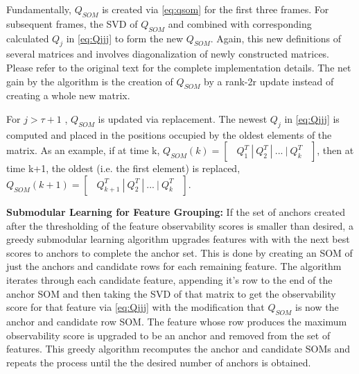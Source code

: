 \documentclass[10pt,twocolumn,letterpaper]{article}
\begin{document}
Fundamentally, $Q_{SOM}$ is created via \eqref{eq:qsom} 
for the first three frames. For subsequent frames, the SVD of $Q_{SOM}$ and combined with corresponding calculated ${Q}_{j}$ in \eqref{eq:Qjjj} to form the new $Q_{SOM}$. Again, this new definitions of several matrices and involves diagonalization of newly constructed matrices. Please refer to the original text for the complete implementation details. The net gain by the algorithm is the creation of $Q_{SOM}$ by a rank-2r update instead of creating a whole new matrix. 

For $j>\tau + 1$ , $Q_{SOM}$ is updated via replacement. The newest ${Q}_{j}$ in \eqref{eq:Qjjj} is computed and placed in the positions occupied by the oldest elements of the matrix. As an example, if at time k, $Q_{SOM}(k) = \begin{bmatrix} \ \ Q_1^T \ | \ Q_2^T \ | \ ... \ | \ Q_k^T  \ \ \end{bmatrix}$, then at time k+1, the oldest (i.e. the first element) is replaced, ${Q}_{SOM}(k+1) = \begin{bmatrix}\ \ Q_{k+1}^T \ | \ Q_2^T \ | \ ... \ | \ Q_k^T\ \ \end{bmatrix}$.

\textbf{Submodular Learning for Feature Grouping:} If the set of anchors created after the thresholding of the feature observability scores is smaller than desired, a greedy submodular learning algorithm upgrades features with with the next best scores to anchors to complete the anchor set. This is done by creating an SOM of just the anchors and candidate rows for each remaining feature. The algorithm iterates through each candidate feature, appending it's row to the end of the anchor SOM and then taking the SVD of that matrix to get the observability score for that feature via \eqref{eq:Qjjj} with the modification that $Q_{SOM}$ is now the anchor and candidate row SOM. The feature whose row produces the maximum observability score is upgraded to be an anchor and removed from the set of features. This greedy algorithm recomputes the anchor and candidate SOMs and repeats the process until the the desired number of anchors is obtained.
\end{document}
